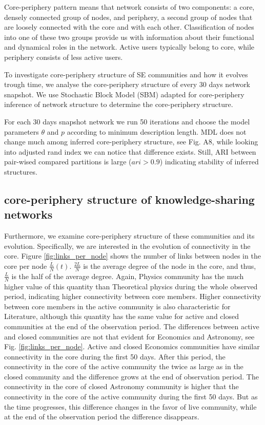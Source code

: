 Core-periphery pattern means that network consists of two components: a core, densely connected group of nodes, and periphery, a second group of nodes that are loosely connected with the core and with each other. Classification of nodes into one of these two groups provide us with information about their functional and dynamical roles in the network. Active users typically belong to core, while periphery consists of less active users.

To investigate core-periphery structure of SE communities and how it evolves trough time, we analyse the core-periphery structure of every 30 days network snapshot. We use Stochastic Block Model (SBM) adapted for core-periphery inference of network structure \cite{gallagher2020clarified} to determine the core-periphery structure.  

For each 30 days snapshot network we run 50 iterations and choose the model parameters $\theta$ and $p$ according to minimum description length. MDL does not change much among inferred core-periphery structure, see Fig. A8, while looking into adjusted rand index we can notice that difference exists. Still, ARI between pair-wised compared partitions is large ($ari >0.9$) indicating stability of inferred structures.

\subsection{core-periphery structure of knowledge-sharing networks}

Furthermore, we examine core-periphery structure of these communities and its evolution. Specifically, we are interested in the evolution of connectivity in the core. Figure \ref{fig:links_per_node} shows the number of links between nodes in the core per node $\frac{L}{N}(t)$. $\frac{2L}{N}$ is the average degree of the node in the core, and thus, $\frac{L}{N}$ is the half of the average degree. Again, Physics community has the much higher value of this quantity than Theoretical physics during the whole observed period, indicating higher connectivity between core members. Higher connectivity between core members in the active community is also characteristic for Literature, although this quantity has the same value for active and closed communities at the end of the observation period. The differences between active and closed communities are not that evident for Economics and Astronomy, see Fig. \ref{fig:links_per_node}. Active and closed Economics communities have similar connectivity in the core during the first 50 days. After this period, the connectivity in the core of the active community the twice as large as in the closed community and the difference grows at the end of observation period. The connectivity in the core of closed Astronomy community is higher that the connectivity in the core of the active community during the first 50 days. But as the time progresses, this difference changes in the favor of live community, while at the end of the observation period the difference disappears.

